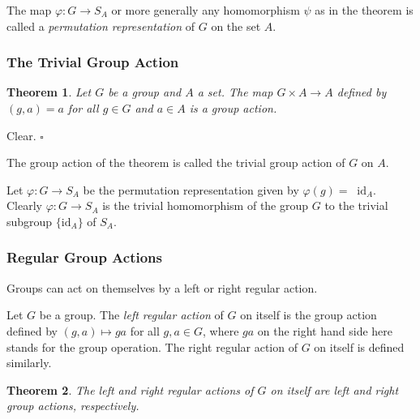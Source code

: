 \documentclass[10pt]{article}
\newtheorem{theorem}{Theorem}[section]
\newenvironment{proof}[1][Proof]{\begin{trivlist}
\item[\hskip \labelsep {\itshape #1}]}{\end{trivlist}}
\newenvironment{definition}[1][Definition]{\begin{trivlist}
\item[\hskip \labelsep {\bfseries #1}]}{\end{trivlist}}
\newenvironment{example}[1][Example]{\begin{trivlist}
\item[\hskip \labelsep {\bfseries #1}]}{\end{trivlist}}
\begin{document}
\begin{definition}
The map $\varphi : G \to S_A$ or more generally any homomorphism $\psi$ as in the theorem is called a \emph{permutation representation} of $G$ on the set $A$.
\end{definition}

\subsubsection{The Trivial Group Action}

\begin{theorem}
Let $G$ be a group and $A$ a set. The map $G\times A \to A$ defined by $(g, a) = a$ for all $g \in G$ and $a \in A$ is a group action.
\end{theorem}

\begin{proof}
Clear. $\square$
\end{proof}

\begin{definition}
The group action of the theorem is called the trivial group action of $G$ on $A$.
\end{definition}

\begin{example}
Let $\varphi : G \to S_A$ be the permutation representation given by $\varphi(g) = \;\;\mbox{id}_A$. Clearly $\varphi : G \to S_A$ is the trivial homomorphism of the group $G$ to the trivial subgroup $\{\mbox{id}_A\}$ of $S_A$.
\end{example}

\subsubsection{Regular Group Actions}

Groups can act on themselves by a left or right regular action.

\begin{definition}
Let $G$ be a group. The \emph{left regular action} of $G$ on itself is the group action defined by $(g, a) \mapsto ga$ for all $g, a \in G$, where $ga$ on the right hand side here stands for the group operation. The right regular action of $G$ on itself is defined similarly.
\end{definition}

\begin{theorem}
The left and right regular actions of $G$ on itself are left and right group actions, respectively.
\end{theorem}
\end{document}
